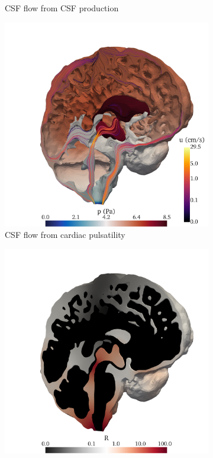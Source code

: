 \documentclass[fleqn,10pt]{wlscirep}
\begin{document}
\begin{figure}[h!]
\begin{subfigure}[b]{0.33\textwidth}
\caption{CSF flow from CSF production}
\label{fig:csf_flow_prod}
\end{subfigure}
\begin{subfigure}[b]{0.33\textwidth}
\includegraphics[width = 1 \textwidth]{figures/cardiac_csf_v.png}
\caption{CSF flow  from cardiac pulsatility}
\label{fig:csf_flow_cardiac}
\end{subfigure}
\begin{subfigure}[b]{0.33\textwidth}
\includegraphics[width = 1 \textwidth]{figures/R.png} 

\end{subfigure}
\end{figure}
\end{document}
